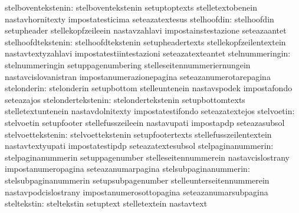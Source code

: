               stelboventekstenin: stelboventekstenin               setuptoptexts
                                  stelletextobenein                nastavhornitexty
                                  impostatesticima                 seteazatextesus
                     stelhoofdin: stelhoofdin                      setupheader
                                  stellekopfzeileein               nastavzahlavi
                                  impostainstestazione             seteazaantet
              stelhoofdtekstenin: stelhoofdtekstenin               setupheadertexts
                                  stellekopfzeilentextein          nastavtextyzahlavi
                                  impostatestiintestazioni         seteazatexteantet
                 stelnummeringin: stelnummeringin                  setuppagenumbering
                                  stelleseitennummeriernungein     nastavcislovanistran
                                  impostanumerazionepagina         seteazanumerotarepagina
                     stelonderin: stelonderin                      setupbottom
                                  stelleuntenein                   nastavspodek
                                  impostafondo                     seteazajos
              stelondertekstenin: stelondertekstenin               setupbottomtexts
                                  stelletextuntenein               nastavdolnitexty
                                  impostatestifondo                seteazatextejos
                      stelvoetin: stelvoetin                       setupfooter
                                  stellefusszeileein               nastavupati
                                  impostapdp                       seteazasubsol
               stelvoettekstenin: stelvoettekstenin                setupfootertexts
                                  stellefusszeilentextein          nastavtextyupati
                                  impostatestipdp                  seteazatextesubsol
              stelpaginanummerin: stelpaginanummerin               setuppagenumber
                                  stelleseitennummerein            nastavcislostrany
                                  impostanumeropagina              seteazanumarpagina
           stelsubpaginanummerin: stelsubpaginanummerin            setupsubpagenumber
                                  stelleunterseitennummerein       nastavpodcislostrany
                                  impostanumerosottopagina         seteazanumarsubpagina
                     steltekstin: steltekstin                      setuptext
                                  stelletextein                    nastavtext
